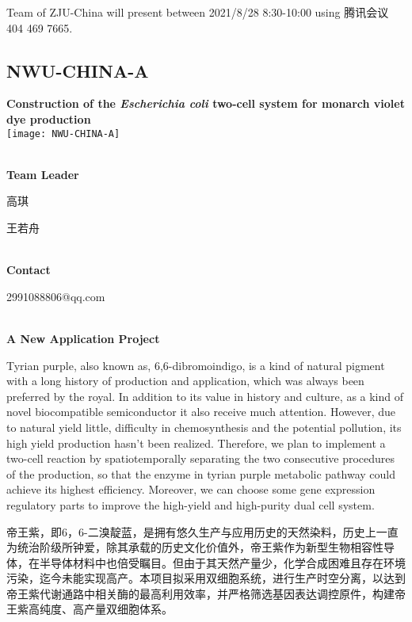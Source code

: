 \vfill{}









Team of ZJU-China will present between    2021/8/28 8:30-10:00     using 腾讯会议 404 469 7665.
\newpage


\subsection{\textcolor{Blu}{ NWU-CHINA-A } }
\vspace{5mm}
\begin{center}
\large{
  \textbf{ Construction of the \textit{Escherichia coli} two-cell system for monarch violet dye production }\\

  \texttt{[image: NWU-CHINA-A]}
}
\end{center}
\textbf{\\Team Leader}

  高琪

  王若舟


\textbf{\\Contact}

  2991088806@qq.com


\textbf{\\A New Application Project\\}\begin{spacing}{1.5}

Tyrian purple, also known as, 6,6-dibromoindigo, is a kind of natural pigment with a long history of production and application, which was always been preferred by the royal. In addition to its value in history and culture, as a kind of novel biocompatible semiconductor it also receive much attention. However, due to natural yield little, difficulty in chemosynthesis and the potential pollution, its high yield production hasn't been realized. Therefore, we plan to implement a two-cell reaction by spatiotemporally separating the two consecutive procedures of the production, so that the enzyme in tyrian purple metabolic pathway could achieve its highest efficiency. Moreover, we can choose some gene expression regulatory parts to improve the high-yield and high-purity dual cell system.

帝王紫，即6，6-二溴靛蓝，是拥有悠久生产与应用历史的天然染料，历史上一直为统治阶级所钟爱，除其承载的历史文化价值外，帝王紫作为新型生物相容性导体，在半导体材料中也倍受瞩目。但由于其天然产量少，化学合成困难且存在环境污染，迄今未能实现高产。本项目拟采用双细胞系统，进行生产时空分离，以达到帝王紫代谢通路中相关酶的最高利用效率，并严格筛选基因表达调控原件，构建帝王紫高纯度、高产量双细胞体系。\end{spacing}
\\

